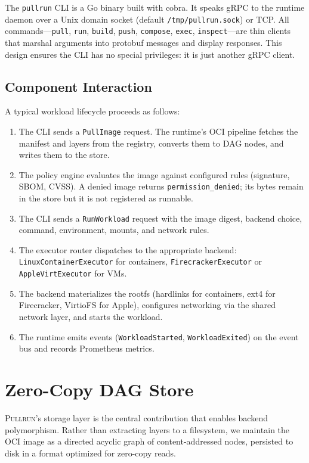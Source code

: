 \documentclass[11pt,a4paper]{article}
\newcommand{\pullrun}{\textsc{Pullrun}}
\begin{document}
The \texttt{pullrun} CLI is a Go binary built with cobra. It speaks gRPC to the runtime daemon over a Unix domain socket (default \texttt{/tmp/pullrun.sock}) or TCP. All commands---\texttt{pull}, \texttt{run}, \texttt{build}, \texttt{push}, \texttt{compose}, \texttt{exec}, \texttt{inspect}---are thin clients that marshal arguments into protobuf messages and display responses. This design ensures the CLI has no special privileges: it is just another gRPC client.

\subsection{Component Interaction}

A typical workload lifecycle proceeds as follows:

\begin{enumerate}[leftmargin=*]
    \item The CLI sends a \texttt{PullImage} request. The runtime's OCI pipeline fetches the manifest and layers from the registry, converts them to DAG nodes, and writes them to the store.
    \item The policy engine evaluates the image against configured rules (signature, SBOM, CVSS). A denied image returns \texttt{permission\_denied}; its bytes remain in the store but it is not registered as runnable.
    \item The CLI sends a \texttt{RunWorkload} request with the image digest, backend choice, command, environment, mounts, and network rules.
    \item The executor router dispatches to the appropriate backend: \texttt{LinuxContainerExecutor} for containers, \texttt{FirecrackerExecutor} or \texttt{AppleVirtExecutor} for VMs.
    \item The backend materializes the rootfs (hardlinks for containers, ext4 for Firecracker, VirtioFS for Apple), configures networking via the shared network layer, and starts the workload.
    \item The runtime emits events (\texttt{WorkloadStarted}, \texttt{WorkloadExited}) on the event bus and records Prometheus metrics.
\end{enumerate}

\section{Zero-Copy DAG Store}\label{sec:dag-store}

\pullrun{}'s storage layer is the central contribution that enables backend polymorphism. Rather than extracting layers to a filesystem, we maintain the OCI image as a directed acyclic graph of content-addressed nodes, persisted to disk in a format optimized for zero-copy reads.
\end{document}
